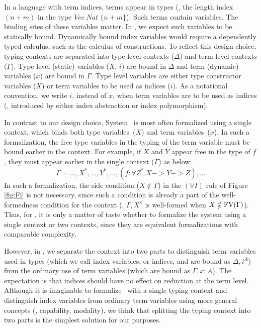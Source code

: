 In a language with term indices, terms appear in types (\eg, the length index
$(n+m)$ in the type $\textit{Vec}\;\textit{Nat}\;\{n+m\}$).
Such terms contain variables. The binding sites of these variables matter.
In \Fi, we expect such variables to be statically bound. Dynamically bound
index variables would require a dependently typed calculus, such as
the calculus of constructions. To reflect this design choice,
typing contexts are separated into type level contexts ($\Delta$) and
term level contexts ($\Gamma$). Type level (static) variables ($X$, $i$) are
bound in $\Delta$ and term (dynamic) variables ($x$) are bound in $\Gamma$.
Type level variables are either type constructor variables ($X$) or
term variables to be used as indices ($i$). As a notational convention,
we write $i$, instead of $x$, when term variables are to be used as indices
(\ie, introduced by either index abstraction or index polymorphism).

In contrast to our design choice, System \Fw\ is most often formalized using
a single context, which binds both type variables~($X$) and term 
variables~($x$). 
In such a formalization, the free type variables in the typing of
the term variable must be bound earlier in the context. For example,
if $X$ and $Y$ appear free in the type of $f$, they must appear earlier
in the single context ($\Gamma$) as below:
\[ \Gamma = \dots,X^{\mathtt*},\dots,Y^{\mathtt*},\dots,
		(f:\forall Z^{\mathtt*}.X -> Y -> Z),\dots \]
In such a formalization, the side condition ($X\notin\Gamma$)
in the $(\forall I)$ rule of Figure \ref{fig:Fi} is not necessary,
since such a condition is already a part of the well-formedness condition
for the context (\ie, $\Gamma,X^\kappa$ is well-formed when
$X\notin\mathop{\mathrm{FV}}(\Gamma)$). Thus, for \Fw, it is only a matter of taste
whether to formalize the system using a single context or two contexts,
since they are equivalent formalizations with comparable complexity.

However, in \Fi, we separate the context into two parts to distinguish
term variables used in types (which we call index variables, or indices,
and are bound as $\Delta,i^A$) from the ordinary use of term variables
(which are bound as $\Gamma,x : A$). The expectation is that indices
should have no effect on reduction at the term level.
Although it is imaginable to formalize \Fi\ with a single typing context
and distinguish index variables from ordinary term variables using
more general concepts (\eg, capability, modality), we think that splitting
the typing context into two parts is the simplest solution for our purposes.

